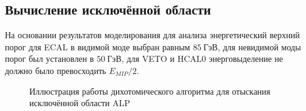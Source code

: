 

\subsection{Вычисление исключённой области}

На основании результатов моделирования для анализа энергетический
верхний порог для ECAL в видимой моде выбран равным $85~\text{ГэВ}$,
для невидимой моды порог был установлен в $50~\text{ГэВ}$, для VETO
и HCAL0 энерговыделение не должно было превосходить $E_{MIP}/2$.

\begin{figure}[ht]
    \centering
    \resizebox{!}{.36\textwidth}{}
    \caption{Иллюстрация работы дихотомического алгоритма для отыскания
    исключённой области ALP}
    \label{fig:alps-dichotomy-search-isometric}
\end{figure}

